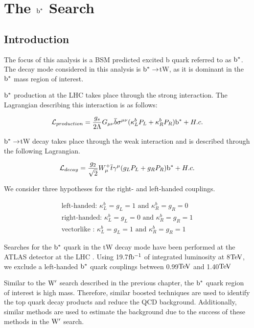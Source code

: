 \chapter{The $\mathrm{b}^{*}$ Search}
\section{Introduction}
\label{sec:bsintroduction}

The focus of this analysis is a BSM predicted \cite{Tait:2000sh} excited b quark referred to as $\mathrm{b}^{*}$.  
The decay mode considered in this analysis is $\mathrm{b}^{*} \to $tW, as it is dominant in the $\mathrm{b}^{*}$ mass region of interest.

$\mathrm{b}^{*}$ production at the LHC takes place through the strong interaction.  The Lagrangian describing this interaction is as follows: 

\begin{eqnarray}
{\cal L}_{production} = \frac{g_s}{2\Lambda}G_{\mu\nu} \overline{b} \sigma^{\mu\nu} (\kappa^{b}_{L}P_L + \kappa^{b}_{R}P_R)\bs + H.c.
\label{eqn:Lag1}
\end{eqnarray}

$\mathrm{b}^{*} \to $tW decay takes place through the weak interaction and is described through the following Lagrangian. 

\begin{eqnarray}
{\cal L}_{decay} = \frac{g_2}{\sqrt{2}}W^{+}_{\mu} \overline{t} \gamma^{\mu}(g_{L}P_L + g_{R}P_R)\bs + H.c.
\label{eqn:Lag2}
\end{eqnarray}

We consider three hypotheses for the right- and left-handed couplings.

\begin{eqnarray}
\text{left-handed: }\kappa^{b}_{L}=g_{L}=1 \text{ and } \kappa^{b}_{R}=g_{R}=0 \\
\text{right-handed: }\kappa^{b}_{L}=g_{L}=0 \text{ and } \kappa^{b}_{R}=g_{R}=1 \\
\text{vectorlike : }\kappa^{b}_{L}=g_{L}=1 \text{ and } \kappa^{b}_{R}=g_{R}=1 
\label{eqn:couplings}
\end{eqnarray}

Searches for the $\mathrm{b}^{*}$ quark in the tW decay mode have been performed at the ATLAS detector at the LHC \cite{Aad:2013rna}.  
Using 19.7$\mathrm{fb^{-1}}$ of integrated luminosity at 8$\mathrm{TeV}$, we exclude a left-handed $\mathrm{b}^{*}$ quark couplings between 0.99$\mathrm{TeV}$ and 1.40$\mathrm{TeV}$  

Similar to the $\mathrm{W}^{\prime}$ search described in the previous chapter, the $\mathrm{b}^{*}$ quark region of interest is high mass.  
Therefore, similar boosted techniques are used to identify the top quark decay products and reduce the QCD background.  
Additionally, similar methods are used to estimate the background due to the success of these methods in the $\mathrm{W}^{\prime}$ search.  

